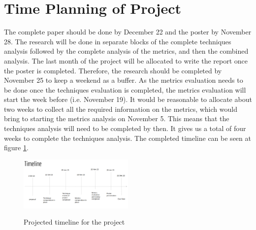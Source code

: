 \documentclass[10pt, conference]{IEEEtran}
\begin{document}
\section{Time Planning of Project}
\label{sec:schedule}

The complete paper should be done by December 22 and the poster by November 28. 
The research will be done in separate blocks of the complete techniques analysis 
followed by the complete analysis of the metrics, and then the combined analysis.
The last month of the project will be allocated to write the report once the 
poster is completed.
Therefore, the research should be completed by November 25 to keep a weekend 
as a buffer. As the metrics evaluation needs to be done once the techniques evaluation is 
completed, the metrics evaluation will start the week before (i.e. November 19).
It would be reasonable to allocate about two weeks to collect all the required 
information on the metrics, which would bring to starting the metrics analysis 
on November 5. 
This means that the techniques analysis will need to be completed by then.
It gives us a total of four weeks to complete the techniques analysis. The 
completed timeline can be seen at figure \ref{fig:timline}.

\begin{figure}[h]
  \caption{Projected timeline for the project}
  \includegraphics[width=0.5\textwidth]{timeline}
  \label{fig:timline}
\end{figure}

\balance


\end{document}
